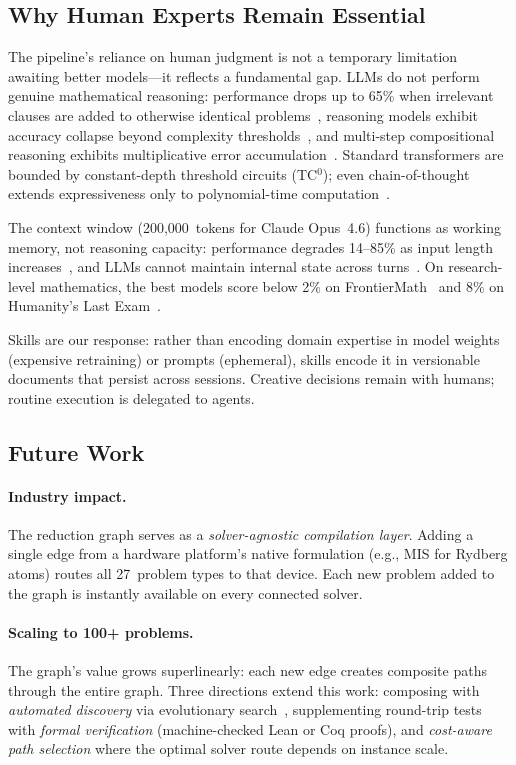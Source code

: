 \documentclass[conference]{IEEEtran}
\begin{document}
\subsection{Why Human Experts Remain Essential}

The pipeline's reliance on human judgment is not a temporary limitation awaiting better models---it reflects a fundamental gap.
LLMs do not perform genuine mathematical reasoning: performance drops up to 65\% when irrelevant clauses are added to otherwise identical problems~\cite{Mirzadeh2025GSMSymbolic}, reasoning models exhibit accuracy collapse beyond complexity thresholds~\cite{Shojaee2025IllusionOfThinking}, and multi-step compositional reasoning exhibits multiplicative error accumulation~\cite{Dziri2023FaithFate}.
Standard transformers are bounded by constant-depth threshold circuits (TC$^0$); even chain-of-thought extends expressiveness only to polynomial-time computation~\cite{Merrill2024ExpressivePower}.

The context window (200,000~tokens for Claude Opus~4.6) functions as working memory, not reasoning capacity: performance degrades 14--85\% as input length increases~\cite{Du2025ContextLengthHurts}, and LLMs cannot maintain internal state across turns~\cite{Huang2025LLMWorkingMemory}.
On research-level mathematics, the best models score below 2\% on FrontierMath~\cite{Glazer2024FrontierMath} and 8\% on Humanity's Last Exam~\cite{Paster2025HLE}.

Skills are our response: rather than encoding domain expertise in model weights (expensive retraining) or prompts (ephemeral), skills encode it in versionable documents that persist across sessions.
Creative decisions remain with humans; routine execution is delegated to agents.

\subsection{Future Work}

\paragraph{Industry impact.}
The reduction graph serves as a \emph{solver-agnostic compilation layer}.
Adding a single edge from a hardware platform's native formulation (e.g., MIS for Rydberg atoms) routes all 27~problem types to that device.
Each new problem added to the graph is instantly available on every connected solver.

\paragraph{Scaling to 100+ problems.}
The graph's value grows superlinearly: each new edge creates composite paths through the entire graph.
Three directions extend this work: composing with \emph{automated discovery} via evolutionary search~\cite{Novikov2025AlphaEvolve}, supplementing round-trip tests with \emph{formal verification} (machine-checked Lean or Coq proofs), and \emph{cost-aware path selection} where the optimal solver route depends on instance scale.
\end{document}
